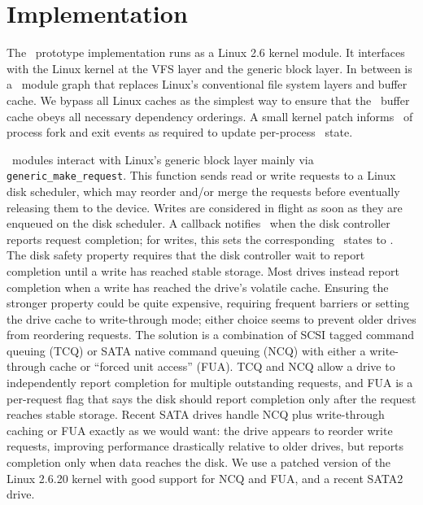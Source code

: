 \section{Implementation}
\label{sec:implementation}

The \Kudos\ prototype implementation runs as a Linux 2.6 kernel module.
%
%
It interfaces with the Linux kernel at the VFS layer and the generic block
layer.
%
In between is a \Kudos\ module graph that replaces Linux's conventional
file system layers and buffer cache.
%
We bypass all Linux caches as the simplest way to ensure that the
\Kudos\ buffer cache obeys all necessary dependency orderings.
%
A small kernel patch informs \Kudos\ of process fork and exit events as
required to update per-process \patchgroup\ state.


\Kudos\ modules interact with Linux's generic block layer mainly via
\verb+generic_make_request+.
%
This function sends read or write requests to a Linux disk scheduler, which
may reorder and/or merge the requests before eventually releasing them to
the device.
%
Writes are considered in flight as soon as they are enqueued on the disk
scheduler.
%
A callback notifies \Kudos\ when the disk controller reports request
completion; for writes, this sets the corresponding \patch\ states to
\PDiskst.
%
The disk safety property requires that the disk controller wait to report
completion until a write has reached stable storage.
%
Most drives instead report completion when a write has reached the drive's
volatile cache.
%
Ensuring the stronger property could be quite expensive, requiring frequent
barriers or setting the drive cache to write-through mode; either choice
seems to prevent older drives from reordering requests.
%
The solution is a combination of SCSI tagged command queuing (TCQ) or SATA
native command queuing (NCQ) with either a write-through cache or ``forced
unit access'' (FUA).
%
TCQ and NCQ allow a drive to independently report completion for multiple
outstanding requests, and FUA is a per-request flag that says the disk
should report completion only after the request reaches stable storage.
%
Recent SATA drives handle NCQ plus write-through caching or FUA exactly as
we would want: the drive appears to reorder write requests, improving
performance drastically relative to older drives, but reports completion
only when data reaches the disk.
%
We use a patched version of the Linux 2.6.20 kernel with good support for
NCQ and FUA, and a recent SATA2 drive.


